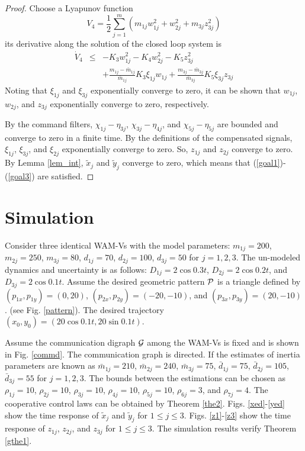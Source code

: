 \documentclass[letterpaper, 10 pt, conference]{ieeeconf}  %
\begin{document}
\begin{proof}
Choose a Lyapunov function
$$V_4=\frac{1}{2}\sum^m_{j=1}(m_{1j}w^2_{1j}+w^2_{2j}+m_{3j}z^2_{3j})$$
its derivative along the solution of the closed loop system is
\begin{eqnarray*}
\dot{V}_4
&\leq &-K_3w^2_{1j}-K_4w^2_{2j}-K_5z^2_{3j}\\
&&+\frac{m_{1j}-\bar{m}_{1j}}{\bar{m}_{1j}}K_3\xi_{1j}w_{1j} +\frac{m_{3j}-\bar{m}_{3j}}{\bar{m}_{3j}}K_5{\xi}_{3j}z_{3j}
\end{eqnarray*}
Noting that $\xi_{1j}$ and $\xi_{3j}$ exponentially converge to zero, it can be shown that $w_{1j}$, $w_{2j}$, and $z_{3j}$ exponentially converge to zero, respectively. 

By the command filters,  $\chi_{1j}-\eta_{3j}$,  $\chi_{3j}-\eta_{4j}$, and $\chi_{5j}-\eta_{5j}$ are bounded and converge to zero in a finite time. By the definitions of the compensated signals, $\xi_{1j}$, $\xi_{3j}$, and $\xi_{2j}$ exponentially converge to zero. So, $z_{1j}$ and $z_{2j}$ converge to zero. By Lemma \ref{lem_int}, $\tilde{x}_j$ and $\tilde{y}_j$ converge to zero, which means that  (\ref{goal1})-(\ref{goal3}) are satisfied.
\end{proof}


\section{Simulation}
\label{sec5}


Consider three identical WAM-Vs with the model parameters: $m_{1j}=200$, $m_{2j}=250$,
$m_{3j}=80$, $d_{1j}=70$, $d_{2j}=100$, $d_{3j}=50$
for $j=1,2,3$. The un-modeled dynamics and uncertainty is as follows: $D_{1j}=2\cos 0.3t$, $D_{2j}=2\cos 0.2t$, and $D_{3j}=2\cos 0.1t$.
Assume the desired geometric pattern $\cal P$ is a triangle defined
by $(p_{1x},p_{1y})=(0,20)$, $(p_{2x},p_{2y})=(-20,-10)$,
and $(p_{3x},p_{3y})=(20,-10)$. (see Fig. \ref{pattern}). The desired trajectory $(x_0,y_0)=(20\cos0.1t, 20\sin0.1t)$.


Assume the communication digraph ${\cal G}$ among the WAM-Vs is
fixed and is shown  in Fig. \ref{commd}. The communication graph is
directed. If the estimates of inertia parameters are known as
$\bar{m}_{1j}=210$, $\bar{m}_{2j}=240$, $\bar{m}_{3j}=75$,
$\bar{d}_{1j}=75$, $\bar{d}_{2j}=105$, $\bar{d}_{3j}=55$
for $j=1,2,3$. The bounds between the estimations can be chosen as
$\rho_{1j}=10$, $\rho_{2j}=10$, $\rho_{3j}=10$, $\rho_{4j}=10$,
$\rho_{5j}=10$, $\rho_{6j}=3$, and $\rho_{7j}=4$. The cooperative
control laws can be obtained by Theorem \ref{the2}. Figs. \ref{xed}-\ref{yed} show the
time response of $\tilde{x}_j$ and $\tilde{y}_j$  for $1\leq
j\leq 3$.  Figs. \ref{z1}-\ref{z3} show the
time response of $z_{1j}$, $z_{2j}$, and $z_{3j}$ for $1\leq j\leq 3$. 
The simulation results verify Theorem \ref{gthe1}.
%
\end{document}
